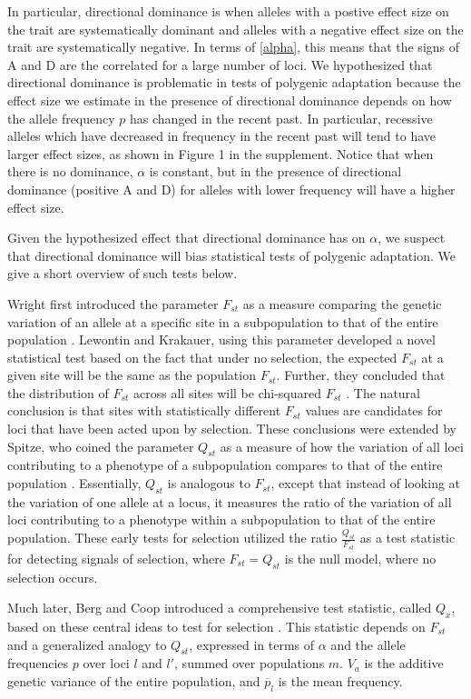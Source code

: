 \documentclass[a4paper,12pt]{article}
\begin{document}
In particular, directional dominance is when alleles with a postive effect
size on the trait are systematically dominant and alleles with a
negative effect size on the trait are systematically negative. In
terms of \eqref{alpha}, this means that the signs of A and D are the
correlated for a large number of loci. We hypothesized that
directional dominance is problematic in tests of polygenic adaptation
because the effect size we estimate in the presence of directional
dominance depends on how the allele frequency $p$ has changed in the
recent past. In particular, recessive alleles which have decreased in frequency
in the recent past will tend to have larger effect sizes, as shown in
Figure 1 in the supplement. Notice that when there is no dominance,
$\alpha$ is constant, but in the presence of directional dominance
(positive A and D) for alleles with lower frequency will have a higher
effect size. 

Given the hypothesized effect that directional dominance has on
$\alpha$, we suspect that directional dominance will bias statistical
tests of polygenic adaptation. We give a short overview of such tests
below.  

Wright first introduced the parameter $F_{st}$ as a measure comparing
the genetic variation of an allele at a specific site in a subpopulation to that of the entire population
\cite{Fst}. Lewontin and Krakauer, using this parameter developed a
novel statistical test based on the fact
that under no selection, the expected $F_{st}$ at a given site will be the same
as the population $F_{st}$. Further, they concluded that the
distribution of $F_{st}$ across all sites will be chi-squared
$F_{st}$ \cite{firstseltest}. The natural conclusion is that sites
with statistically different $F_{st}$ values are candidates for loci
that have been acted upon by selection. These conclusions were extended by Spitze, who coined the
parameter $Q_{st}$ as a measure of how the variation of all loci
contributing to a phenotype of a subpopulation compares to that of the entire
population \cite{Qst}. Essentially, $Q_{st}$ is analogous to $F_{st}$,
except that instead of looking at the variation of one allele at a
locus, it measures the ratio of the variation of all loci contributing to a
phenotype within a subpopulation to that of the entire population. These early tests for selection utilized the ratio
$\frac{Q_{st}}{F_{st}}$ as a test statistic for detecting signals of
selection, where $F_{st} = Q_{st}$ is the null model, where no
selection occurs.

Much later, Berg and Coop introduced a comprehensive test statistic,
called $Q_x$, based on these central ideas to test
for selection \cite{berg}. This statistic depends on $F_{st}$ and
a generalized analogy to $Q_{st}$, expressed in terms of $\alpha$ and
the allele frequencies $p$ over loci $l$ and $l'$, summed over
populations $m$. $V_a$ is the additive genetic variance of the entire
population, and $\overline{p}_l$ is the mean frequency.
\end{document}
